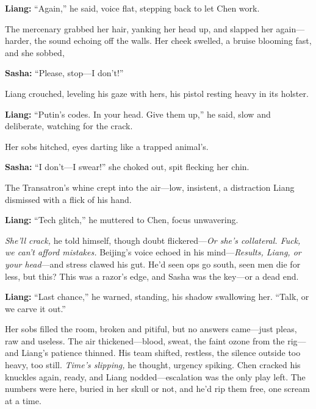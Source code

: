 \documentclass[12pt]{book}
\begin{document}
\vspace{0.5em}
\textbf{Liang:} “Again,” he said, voice flat, stepping back to let Chen work.

The mercenary grabbed her hair, yanking her head up, and slapped her again—harder, the sound echoing off the walls. Her cheek swelled, a bruise blooming fast, and she sobbed, 

\vspace{0.5em}
\textbf{Sasha:} “Please, stop—I don’t!”

Liang crouched, leveling his gaze with hers, his pistol resting heavy in its holster. 

\vspace{0.5em}
\textbf{Liang:} “Putin’s codes. In your head. Give them up,” he said, slow and deliberate, watching for the crack.

Her sobs hitched, eyes darting like a trapped animal’s. 

\vspace{0.5em}
\textbf{Sasha:} “I don’t—I swear!” she choked out, spit flecking her chin.

The Transatron’s whine crept into the air—low, insistent, a distraction Liang dismissed with a flick of his hand. 

\vspace{0.5em}
\textbf{Liang:} “Tech glitch,” he muttered to Chen, focus unwavering.

\emph{She’ll crack,} he told himself, though doubt flickered—\emph{Or she’s collateral. Fuck, we can’t afford mistakes.} Beijing’s voice echoed in his mind—\emph{Results, Liang, or your head}—and stress clawed his gut. He’d seen ops go south, seen men die for less, but this? This was a razor’s edge, and Sasha was the key—or a dead end. 

\vspace{0.5em}
\textbf{Liang:} “Last chance,” he warned, standing, his shadow swallowing her. “Talk, or we carve it out.”

Her sobs filled the room, broken and pitiful, but no answers came—just pleas, raw and useless. The air thickened—blood, sweat, the faint ozone from the rig—and Liang’s patience thinned. His team shifted, restless, the silence outside too heavy, too still. \emph{Time’s slipping,} he thought, urgency spiking. Chen cracked his knuckles again, ready, and Liang nodded—escalation was the only play left. The numbers were here, buried in her skull or not, and he’d rip them free, one scream at a time.

\vspace{1em}
\end{document}
